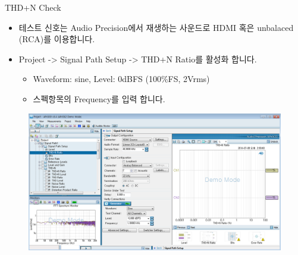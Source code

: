 \documentclass{beamer}
\begin{document}
\begin{frame}[t]{THD+N Check}
\begin{itemize}
\item 테스트 신호는 Audio Precision에서 재생하는 사운드로 HDMI 혹은 unbalaced (RCA)를 이용합니다.
\item Project -> Signal Path Setup -> THD+N Ratio를 활성화 합니다.
	\begin{itemize}
	\item Waveform: sine, Level: 0dBFS (100\%FS, 2Vrms)
	\item 스펙항목의 Frequency를 입력 합니다.
	\end{itemize}
\end{itemize}

\begin{figure}[b]
\includegraphics[height=0.4\textwidth]{figure/apsetting/thdn.png}
\end{figure}

\end{frame}
\end{document}
